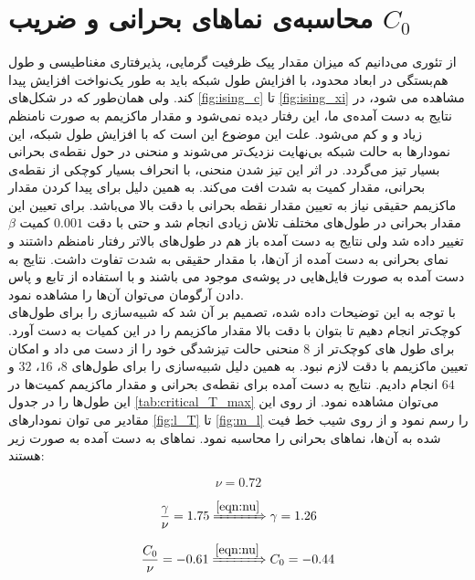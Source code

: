 \documentclass[11pt, a4paper]{article}
\begin{document}
\section{\textbf{محاسبه‌ی نماهای بحرانی و ضریب $C_0$}}
از تئوری می‌دانیم که میزان مقدار پیک ظرفیت‌ گرمایی، پذیرفتاری مغناطیسی و طول هم‌بستگی در ابعاد محدود،
با افزایش طول شبکه باید به طور یک‌نواخت افزایش پیدا کند.
ولی همان‌طور که در شکل‌های
\ref{fig:ising_c}
تا
\ref{fig:ising_xi}
مشاهده می شود، در نتایج به دست آمده‌ی ما،
این رفتار دیده نمی‌شود و مقدار ماکزیمم به صورت نامنظم زیاد و و کم می‌شود.
علت این موضوع این است که با افزایش طول شبکه،
این نمودارها به حالت شبکه بی‌نهایت نزدیک‌تر می‌شوند و منحنی در حول نقطه‌ی بحرانی بسیار تیز می‌گردد.
در اثر این تیز شدن منحنی، با انحراف بسیار کوچکی از نقطه‌ی بحرانی،
مقدار کمیت به شدت افت می‌کند.
به همین دلیل برای پیدا کردن مقدار ماکزیمم حقیقی نیاز به تعیین مقدار نقطه بحرانی با دقت بالا می‌باشد.
برای تعیین این مقدار بحرانی در طول‌های مختلف تلاش زیادی انجام شد و حتی با دقت
$0.001$
کمیت
$\beta$
تغییر داده شد ولی نتایج به دست آمده باز هم در طول‌های بالاتر رفتار نامنظم داشتند و نمای بحرانی به دست آمده از آن‌ها،
با مقدار حقیقی به شدت تفاوت داشت.
نتایج به دست آمده به صورت فایل‌هایی
در پوشه‌ی
موجود می ‌باشند و با استفاده از تابع
و پاس دادن آرگومان
می‌توان آن‌ها را مشاهده نمود.
\\
با توجه به این توضیحات داده شده،
تصمیم بر آن شد که شبیه‌سازی را برای طول‌های کوچک‌تر انجام دهیم تا بتوان با دقت بالا مقدار ماکزیمم را در این کمیات به دست آورد.
برای طول های کوچک‌تر از
$8$
منحنی حالت تیز‌شدگی خود را از دست می داد و امکان تعیین ماکزیمم با دقت لازم نبود.
به همین دلیل شبیه‌سازی را برای طول‌های
$8$،
$16$،
$32$
و
$64$
انجام دادیم.
نتایج به دست آمده برای نقطه‌ی بحرانی و مقدار ماکزیمم کمیت‌ها در این‌ طول‌ها را در جدول
\ref{tab:critical_T_max}
می‌توان مشاهده نمود.
از روی این مقادیر می توان نمودار‌های
\ref{fig:l_T}
تا
\ref{fig:m_l}
را رسم نمود و از روی شیب خط فیت شده به آن‌ها،
نماهای بحرانی را محاسبه نمود.
نماهای به دست آمده به صورت زیر هستند:

\begin{equation}
  \nu = 0.72
  \label{eqn:nu}
\end{equation}

\begin{equation}
  \frac{\gamma}{\nu} = 1.75
  \xRightarrow{\eqref{eqn:nu}}
  \gamma = 1.26
\end{equation}

\begin{equation}
  \frac{C_0}{\nu} = -0.61
  \xRightarrow{\eqref{eqn:nu}}
  C_0 = -0.44
\end{equation}
\end{document}

